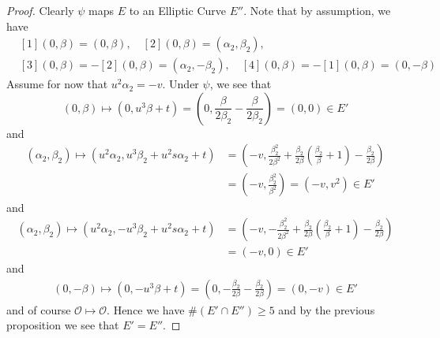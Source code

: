 \documentclass{scrartcl}
\renewcommand{\O}{\mathcal{O}}
\theoremstyle{definition}
\begin{document}
\begin{proof}
    Clearly $\psi$ maps $E$ to an Elliptic Curve $E''$.
    Note that by assumption, we have
    \begin{align*}
        &[1](0, \beta) = (0, \beta), \quad [2](0, \beta) = (\alpha_2, \beta_2), \\
        &[3](0, \beta) = -[2](0, \beta) = (\alpha_2, -\beta_2), \quad [4](0, \beta) = -[1](0, \beta) = (0, -\beta)
    \end{align*}
    Assume for now that $u^2 \alpha_2 = -v$.
    Under $\psi$, we see that
    \begin{equation*}
        (0, \beta) \mapsto (0, u^3 \beta + t) = \left( 0, \frac {\beta} {2\beta_2} - \frac {\beta} {2\beta_2} \right) = (0, 0) \in E'
    \end{equation*}
    and
    \begin{align*}
        (\alpha_2, \beta_2) \mapsto (u^2 \alpha_2, u^3 \beta_2 + u^2 s \alpha_2 + t) &= \left(-v, \frac {\beta_2^2} {2\beta^2} + \frac {\beta_2} {2\beta} \left( \frac {\beta_2} {\beta} + 1 \right) - \frac {\beta_2} {2\beta} \right) \\
        &= \left( -v, \frac {\beta_2^2} {\beta^2} \right) = (-v, v^2) \in E'
    \end{align*}
    and
    \begin{align*}
        (\alpha_2, \beta_2) \mapsto (u^2 \alpha_2, -u^3 \beta_2 + u^2 s \alpha_2 + t) &= \left(-v, -\frac {\beta_2^2} {2\beta^2} + \frac {\beta_2} {2\beta} \left( \frac {\beta_2} {\beta} + 1 \right) - \frac {\beta_2} {2\beta} \right) \\
        &= (-v, 0) \in E'
    \end{align*}
    and
    \begin{align*}
        (0, -\beta) \mapsto (0, -u^3 \beta + t) = \left( 0, -\frac {\beta_2} {2\beta} - \frac {\beta_2} {2\beta} \right) = (0, -v) \in E'
    \end{align*}
    and of course $\O \mapsto \O$.
    Hence we have $\#(E' \cap E'') \geq 5$ and by the previous proposition we see that $E' = E''$.
    

\end{proof}
\end{document}
